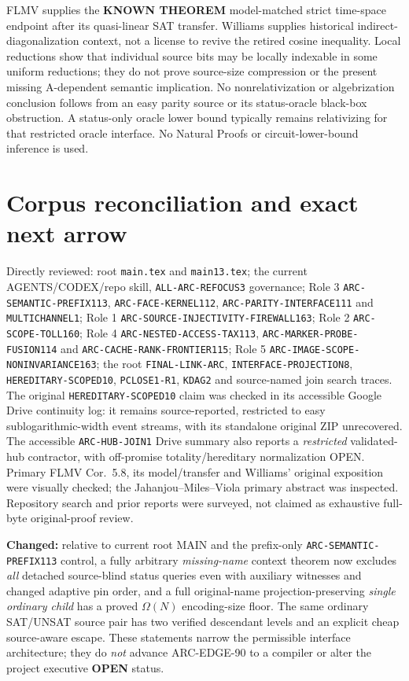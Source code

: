 \documentclass[11pt]{article}
\newcommand{\OPEN}{\textbf{OPEN}}
\begin{document}
FLMV \cite{flmv} supplies the
\textbf{KNOWN THEOREM} model-matched strict
time-space endpoint after its quasi-linear SAT transfer.
Williams \cite{williams} supplies historical
indirect-diagonalization context, not a license to revive
the retired cosine inequality. Local reductions
\cite{jmv} show that individual source bits may be
locally indexable in some uniform reductions; they do
not prove source-size compression or the present missing
A-dependent semantic implication. No nonrelativization
or algebrization conclusion follows from an easy parity
source or its status-oracle black-box obstruction.
A status-only oracle lower bound typically remains
relativizing for that restricted oracle interface.
No Natural Proofs or circuit-lower-bound inference is used.

\section{Corpus reconciliation and exact next arrow}
Directly reviewed: root \texttt{main.tex} and
\texttt{main13.tex}; the current AGENTS/CODEX/repo
skill, \texttt{ALL-ARC-REFOCUS3} governance;
Role 3 \texttt{ARC-SEMANTIC-PREFIX113},
\texttt{ARC-FACE-KERNEL112},
\texttt{ARC-PARITY-INTERFACE111} and
\texttt{MULTICHANNEL1}; Role 1
\texttt{ARC-SOURCE-INJECTIVITY-FIREWALL163};
Role 2 \texttt{ARC-SCOPE-TOLL160};
Role 4 \texttt{ARC-NESTED-ACCESS-TAX113},
\texttt{ARC-MARKER-PROBE-FUSION114} and
\texttt{ARC-CACHE-RANK-FRONTIER115};
Role 5 \texttt{ARC-IMAGE-SCOPE-NONINVARIANCE163};
the root \texttt{FINAL-LINK-ARC},
\texttt{INTERFACE-PROJECTION8},
\texttt{HEREDITARY-SCOPED10},
\texttt{PCLOSE1-R1}, \texttt{KDAG2}
and source-named join search traces.
The original \texttt{HEREDITARY-SCOPED10}
claim was checked in its accessible Google Drive
continuity log: it remains source-reported, restricted to
easy sublogarithmic-width event streams, with its
standalone original ZIP unrecovered. The accessible
\texttt{ARC-HUB-JOIN1} Drive summary also reports
a \emph{restricted} validated-hub contractor, with
off-promise totality/hereditary normalization OPEN.
Primary FLMV Cor.~5.8, its model/transfer and
Williams' original exposition were visually checked;
the Jahanjou--Miles--Viola primary abstract was inspected.
Repository search and prior reports were surveyed, not
claimed as exhaustive full-byte original-proof review.

\noindent\textbf{Changed:} relative to current root MAIN and
the prefix-only \texttt{ARC-SEMANTIC-PREFIX113} control,
a fully arbitrary \emph{missing-name} context theorem
now excludes \emph{all} detached source-blind status
queries even with auxiliary witnesses and changed
adaptive pin order, and a full original-name
projection-preserving \emph{single ordinary child}
has a proved $\Omega(N)$ encoding-size floor.
The same ordinary SAT/UNSAT source pair has two
verified descendant levels and an explicit cheap
source-aware escape. These statements narrow
the permissible interface architecture; they do
\emph{not} advance ARC-EDGE-90 to a compiler or
alter the project executive \OPEN{} status.
\end{document}
